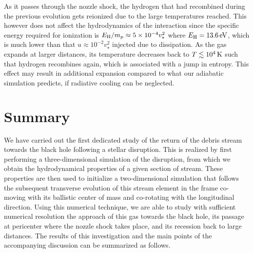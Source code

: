 \documentclass[a4paper,fleqn,usenatbib]{mnras}
\def\kelvin{\, \rm K}
\begin{document}
As it passes through the nozzle shock, the hydrogen that had recombined during the previous evolution \citep[e.g.][]{kasen2010} gets reionized due to the large temperatures reached. This however does not affect the hydrodynamics of the interaction since the specific energy required for ionization is $E_{\rm H}/m_{\rm p} \approx 5 \times 10^{-4} v^2_{\star}$ where $E_{\rm H} = 13.6 \, \rm eV$, which is much lower than that $u \approx 10^{-2} v^2_{\star}$ injected due to dissipation. As the gas expands at larger distances, its temperature decreases back to $T \lesssim 10^4 \kelvin$ such that hydrogen recombines again, which is associated with a jump in entropy. This effect may result in additional expansion compared to what our adiabatic simulation predicts, if radiative cooling can be neglected. 


\section{Summary}
\label{sec:summary}


We have carried out the first dedicated study of the return of the debris stream towards the black hole following a stellar disruption. This is realized by first performing a three-dimensional simulation of the disruption, from which we obtain the hydrodynamical properties of a given section of stream. These properties are then used to initialize a two-dimensional simulation that follows the subsequent transverse evolution of this stream element in the frame co-moving with its ballistic center of mass and co-rotating with the longitudinal direction. Using this numerical technique, we are able to study with sufficient numerical resolution the approach of this gas towards the black hole, its passage at pericenter where the nozzle shock takes place, and its recession back to large distances. The results of this investigation and the main points of the accompanying discussion can be summarized as follows.
\end{document}
